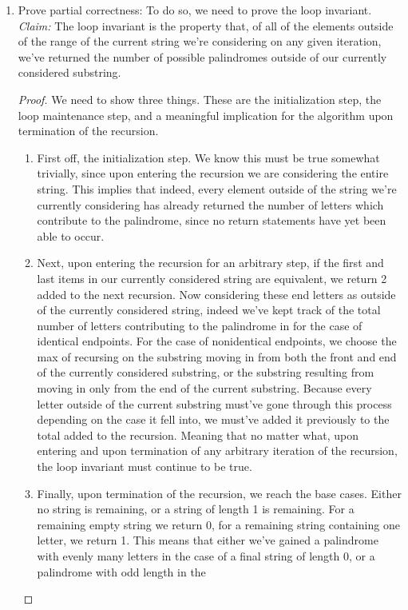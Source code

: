 \documentclass{article}
\begin{document}
\begin{enumerate}
	\item Prove partial correctness:
		To do so, we need to prove the loop invariant. 
		\textit{Claim:} The loop invariant is the property that, of all of the elements outside of the range of the current
		string we're considering on any given iteration, we've returned the number of possible palindromes outside of
		our currently considered substring.
		\begin{proof}
			We need to show three things. These are the initialization step, the loop maintenance step, and a
			meaningful implication for the algorithm upon termination of the recursion.
			\begin{enumerate}
				\item First off, the initialization step. We know this must be true somewhat trivially, since
					upon entering the recursion we are considering the entire string. This implies that
					indeed, every element outside of the string we're currently considering has already
					returned the number of letters which contribute to the palindrome, since no return 
					statements have yet been able to occur.
				\item Next, upon entering the recursion for an arbitrary step, if the first and last items 
					in our currently considered string are equivalent, we return 2 added to the next recursion.
					Now considering these end letters as outside of the currently considered string, indeed
					we've kept track of the total number of letters contributing to the palindrome in for the
					case of identical endpoints. For the case of nonidentical endpoints, we choose the max of
					recursing on the substring moving in from both the front and end of the currently considered
					substring, or the substring resulting from moving in only from the end of the current substring.
					Because every letter outside of the current substring must've gone through this process depending on
					the case it fell into, we must've added it previously to the total added to the recursion. Meaning
					that no matter what, upon entering and upon termination of any arbitrary iteration of the recursion,
					the loop invariant must continue to be true.
				\item Finally, upon termination of the recursion, we reach the base cases. Either no string is remaining, 
					or a string of length 1 is remaining. For a remaining empty string we return 0, for a remaining 
					string containing one letter, we return 1. This means that either we've gained a palindrome with
					evenly many letters in the case of a final string of length 0, or a palindrome with odd length in the

\end{enumerate}
\end{proof}
\end{enumerate}
\end{document}
